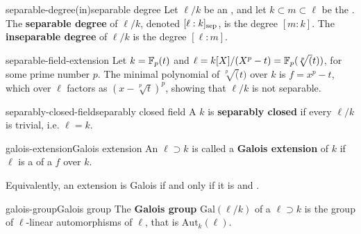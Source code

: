 \begin{topic}{separable-degree}{(in)separable degree}
    Let $\ell/k$ be an , and let $k \subset m \subset \ell$ be the . The \textbf{separable degree} of $\ell/k$, denoted $[\ell : k]_\textup{sep}$, is the degree $[m : k]$. The \textbf{inseparable degree} of $\ell/k$ is the degree $[\ell : m]$.
\end{topic}

\begin{example}{separable-field-extension}
    Let $k = \mathbb{F}_p(t)$ and $\ell = k[X] / (X^p - t) = \mathbb{F}_p(\sqrt[p](t))$, for some prime number $p$. The minimal polynomial of $\sqrt[p](t)$ over $k$ is $f = x^p - t$, which over $\ell$ factors as $(x - \sqrt[p]{t})^p$, showing that $\ell/k$ is not separable.
\end{example}

\begin{topic}{separably-closed-field}{separably closed field}
    A  $k$ is \textbf{separably closed} if every  $\ell/k$ is trivial, i.e. $\ell = k$.
\end{topic}

\begin{topic}{galois-extension}{Galois extension}
    An   $\ell \supset k$ is called a \textbf{Galois extension} of $k$ if $\ell$ is a  of a  $f$ over $k$.
    
    Equivalently, an extension is Galois if and only if it is  and .
\end{topic}

\begin{topic}{galois-group}{Galois group}
    The \textbf{Galois group} $\text{Gal}(\ell/k)$ of a  $\ell \supset k$ is the group of $\ell$-linear automorphisms of $\ell$, that is $\text{Aut}_k(\ell)$.
\end{topic}

